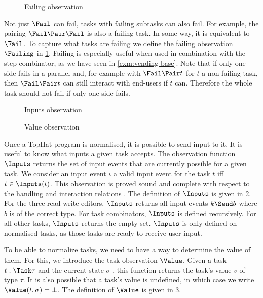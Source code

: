 \begin{figure}
  \caption{Failing observation}
  \label{fig:observation-failing}
\end{figure}

Not just $\Fail$ can fail, tasks with failing subtasks can also fail.
For example, the pairing $\Fail \Pair \Fail$ is also a failing task.
In some way, it is equivalent to $\Fail$.
To capture what tasks are failing we define the failing observation $\Failing$ in \cref{fig:observation-failing}.
Failing is especially useful when used in combination with the step combinator,
as we have seen in \cref{exm:vending-base}.
Note that if only one side fails in a parallel-and,
for example with $\Fail \Pair t$ for $t$ a non-failing task,
then $\Fail \Pair t$ can still interact with end-users if $t$ can.
Therefore the whole task should not fail if only one side fails.

\begin{figure}[b]
  \caption{Inputs observation}
  \label{fig:observation-inputs}
\end{figure}

\begin{figure}[b]
  \caption{Value observation}
  \label{fig:observation-value}
\end{figure}

Once a TopHat program is normalised, it is possible to send input to it.
It is useful to know what inputs a given task accepts.
The observation function $\Inputs$ returns the set of input events that are currently possible for a given task.
We consider an input event $\iota$ a valid input event for the task $t$ iff $t \in \Inputs(t)$.
This observation is proved sound and complete with respect to the handling and interaction relations \cite{Steenvoorden22}.
The definition of $\Inputs$ is given in \cref{fig:observation-inputs}.
For the three read-write editors, $\Inputs$ returns all input events $k \Send b$ where $b$ is of the correct type.
For task combinators, $\Inputs$ is defined recursively.
For all other tasks, $\Inputs$ returns the empty set.
$\Inputs$ is only defined on normalised tasks, as those tasks are ready to receive user input.

To be able to normalize tasks, we need to have a way to determine the value of them.
For this, we introduce the task observation $\Value$.
Given a task $t:\Task\tau$ and the current state $\sigma$ ,
this function returns the task's value $v$ of type $\tau$.
It is also possible that a task's value is undefined, in which case we write $\Value(t,\sigma) = \bot$.
The definition of $\Value$ is given in \cref{fig:observation-value}.
